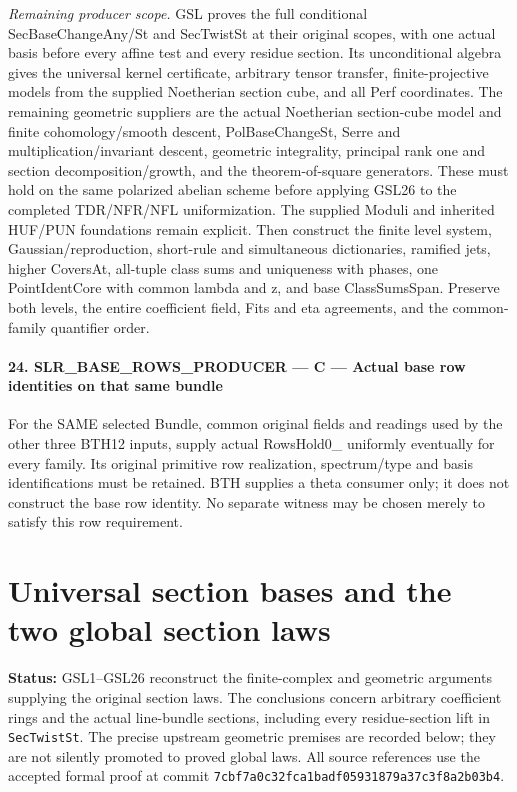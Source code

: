 \documentclass[11pt,a4paper]{article}
\numberwithin{equation}{section}
\theoremstyle{remark}\newtheorem{remark}[theorem]{Remark}
\newcommand{\status}[1]{\textbf{Status:} #1}
\begin{document}
\emph{Remaining producer scope.} GSL proves the full conditional SecBaseChangeAny/St and SecTwistSt at their original scopes, with one actual basis before every affine test and every residue section. Its unconditional algebra gives the universal kernel certificate, arbitrary tensor transfer, finite-projective models from the supplied Noetherian section cube, and all Perf coordinates. The remaining geometric suppliers are the actual Noetherian section-cube model and finite cohomology/smooth descent, PolBaseChangeSt, Serre and multiplication/invariant descent, geometric integrality, principal rank one and section decomposition/growth, and the theorem-of-square generators. These must hold on the same polarized abelian scheme before applying GSL26 to the completed TDR/NFR/NFL uniformization. The supplied Moduli and inherited HUF/PUN foundations remain explicit. Then construct the finite level system, Gaussian/reproduction, short-rule and simultaneous dictionaries, ramified jets, higher CoversAt, all-tuple class sums and uniqueness with phases, one PointIdentCore with common lambda and z, and base ClassSumsSpan. Preserve both levels, the entire coefficient field, Fits and eta agreements, and the common-family quantifier order.



\paragraph{24. SLR\_\allowbreak BASE\_\allowbreak ROWS\_\allowbreak PRODUCER — C — Actual base row identities on that same bundle}

For the SAME selected Bundle, common original fields and readings used by the other three BTH12 inputs, supply actual RowsHold0\_ uniformly eventually for every family. Its original primitive row realization, spectrum/type and basis identifications must be retained. BTH supplies a theta consumer only; it does not construct the base row identity. No separate witness may be chosen merely to satisfy this row requirement.



\clearpage
\section{Universal section bases and the two global section laws}
\label{sec:global-section-laws-v052}

\status{GSL1--GSL26 reconstruct the finite-complex and geometric
arguments supplying the original section laws.  The conclusions concern
arbitrary coefficient rings and the actual line-bundle sections, including
every residue-section lift in \texttt{Sec\allowbreak Twist\allowbreak St}.  The precise upstream
geometric premises are recorded below; they are not silently promoted to
proved global laws.  All source references use the accepted formal proof
at commit \texttt{7cbf7a0c32fca1badf05931879a37c3f8a2b03b4}.}
\end{document}
